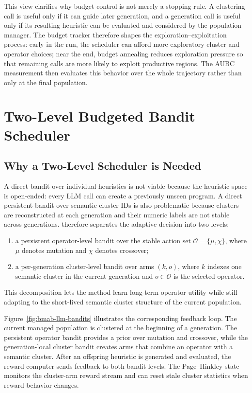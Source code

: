 This view clarifies why budget control is not merely a stopping rule. A clustering call is useful only if it can guide later generation, and a generation call is useful only if its resulting heuristic can be evaluated and considered by the population manager. The budget tracker therefore shapes the exploration--exploitation process: early in the run, the scheduler can afford more exploratory cluster and operator choices; near the end, budget annealing reduces exploration pressure so that remaining calls are more likely to exploit productive regions. The AUBC measurement then evaluates this behavior over the whole trajectory rather than only at the final population.

\section{Two-Level Budgeted Bandit Scheduler}

\subsection{Why a Two-Level Scheduler is Needed}

A direct bandit over individual heuristics is not viable because the heuristic space is open-ended: every LLM call can create a previously unseen program. A direct persistent bandit over semantic cluster IDs is also problematic because clusters are reconstructed at each generation and their numeric labels are not stable across generations. \bmab{} therefore separates the adaptive decision into two levels:

\begin{enumerate}
  \item a persistent operator-level bandit over the stable action set $\mathcal{O}=\{\mu,\chi\}$, where $\mu$ denotes mutation and $\chi$ denotes crossover;
  \item a per-generation cluster-level bandit over arms $(k,o)$, where $k$ indexes one semantic cluster in the current generation and $o \in \mathcal{O}$ is the selected operator.
\end{enumerate}

This decomposition lets the method learn long-term operator utility while still adapting to the short-lived semantic cluster structure of the current population.

Figure~\ref{fig:bmab-llm-bandits} illustrates the corresponding feedback loop. The current managed population is clustered at the beginning of a generation. The persistent operator bandit provides a prior over mutation and crossover, while the generation-local cluster bandit creates arms that combine an operator with a semantic cluster. After an offspring heuristic is generated and evaluated, the reward computer sends feedback to both bandit levels. The Page--Hinkley state monitors the cluster-arm reward stream and can reset stale cluster statistics when reward behavior changes.

